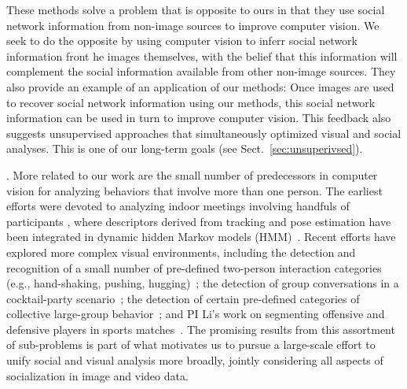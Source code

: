 These methods solve a problem that is opposite to ours in that they use social network information from non-image sources to improve computer vision. We seek to do the opposite by using computer vision to inferr social network information front he images themselves, with the belief that this information will complement the social information available from other non-image sources. They also provide an example of an application of our methods: Once images are used to recover social network information using our methods, this social network information can be used in turn to improve computer vision. This feedback also suggests unsupervised approaches that simultaneously optimized visual and social analyses. This is one of our long-term goals (see Sect.~\ref{sec:unsuperivsed}).

. More related to our work are the small number of predecessors in computer vision for analyzing behaviors that involve more than one person. The earliest efforts were devoted to analyzing indoor meetings involving handfuls of participants \cite{GaticaPerez,McCowan:meeting}, where descriptors derived from tracking \cite{Smith:track} and pose estimation \cite{Ba:meeting} have been integrated in dynamic hidden Markov models (HMM)~\cite{Zhang:meeting}. Recent efforts have explored more complex visual environments, including the detection and recognition of a small number of pre-defined two-person interaction categories (e.g., hand-shaking, pushing, hugging)~\cite{UTdata}; the detection of group conversations in a cocktail-party scenario~\cite{Cristani:fformation}; the detection of certain pre-defined categories of collective large-group behavior~\cite{Choi:context,Choi:recogtrack,Amer:group,Lan:Group}; and PI Li's work on segmenting offensive and defensive players in sports matches~\cite{LiIJCV2012}. The promising results from this assortment of sub-problems is part of what motivates us to pursue a large-scale effort to unify social and visual analysis more broadly, jointly considering all aspects of socialization in image and video data. 
